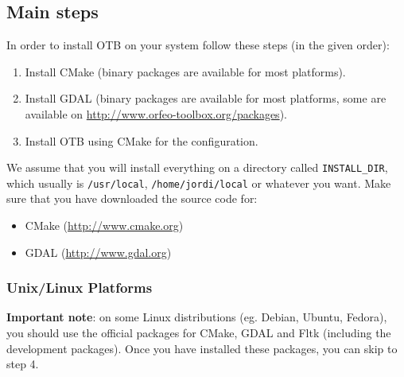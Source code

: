\subsection{Main steps}
In order to install OTB on your system follow these steps (in the
given order):
\begin{enumerate}
  \item Install CMake (binary packages are available for most platforms).
  \item Install GDAL (binary packages are available for most platforms, some are available on \url{http://www.orfeo-toolbox.org/packages}).
  \item Install OTB using CMake for the configuration.
\end{enumerate}

We assume that you will install everything on a directory called
\texttt{INSTALL\_DIR}, which usually is \texttt{/usr/local}, \texttt{/home/jordi/local} or
whatever you want. Make sure that you have downloaded the source code for:
  \begin{itemize}
  \item CMake (\url{http://www.cmake.org})
  \item GDAL (\url{http://www.gdal.org})
  \end{itemize}

\subsubsection{Unix/Linux Platforms}

\textbf{Important note}: on some Linux distributions (eg. Debian, Ubuntu, Fedora), you should use
the official packages for CMake, GDAL and Fltk (including the development packages). Once you have installed these
packages, you can skip to step 4.

